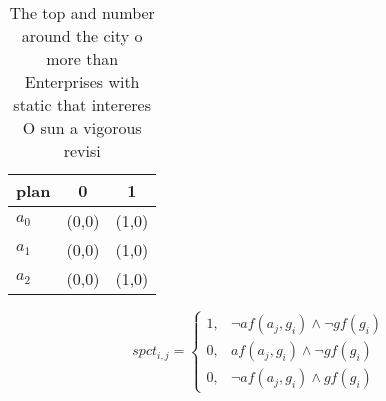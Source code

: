 \documentclass[a4paper]{article}
\begin{document}
\begin{table}
\begin{adjustbox}{width=0.8\columnwidth}
\begin{tabular}{|l|l|l|}
\hline
\textbf{plan} & \multicolumn{1}{c|}{\textbf{0}} & \multicolumn{1}{c|}{\textbf{1}} \\ \hline
\textbf{$a_0$}  & (0,0) & (1,0) \\ \hline
\textbf{$a_1$}  & (0,0) & (1,0) \\ \hline
\textbf{$a_2$}  & (0,0) & (1,0) \\ \hline
\end{tabular}
\end{adjustbox}
\caption{The top and number around the city o more than Enterprises with static that intereres O sun a vigorous revisi
}
\end{table}

\begin{equation}
spct_{i,j} =
\begin{cases}
1, & \text{$\neg af(a_j,g_i) \wedge \neg gf(g_i)$}\\
0, & \text{$af(a_j,g_i) \wedge \neg gf(g_i)$}\\
0, & \text{$\neg af(a_j,g_i) \wedge gf(g_i)$}
\end{cases}
\end{equation}
\end{document}
